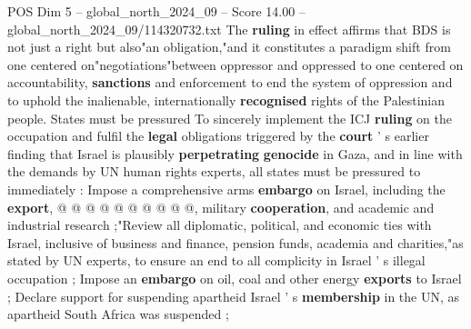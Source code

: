 \begin{textsample}{POS Dim 5 – global\_north\_2024\_09 – Score 14.00 – global\_north\_2024\_09/114320732.txt}
The \textbf{ruling} in effect affirms that BDS is not just a right but also"an obligation,"and it constitutes a paradigm shift from one centered on"negotiations"between oppressor and oppressed to one centered on accountability, \textbf{sanctions} and enforcement to end the system of oppression and to uphold the inalienable, internationally \textbf{recognised} rights of the Palestinian people.
States must be pressured To sincerely implement the ICJ \textbf{ruling} on the occupation and fulfil the \textbf{legal} obligations triggered by the \textbf{court} ' s earlier finding that Israel is plausibly \textbf{perpetrating} \textbf{genocide} in Gaza, and in line with the demands by UN human rights experts, all states must be pressured to immediately : Impose a comprehensive arms \textbf{embargo} on Israel, including the \textbf{export}, @ @ @ @ @ @ @ @ @ @, military \textbf{cooperation}, and academic and industrial research ;"Review all diplomatic, political, and economic ties with Israel, inclusive of business and finance, pension funds, academia and charities,"as stated by UN experts, to ensure an end to all complicity in Israel ' s illegal occupation ; Impose an \textbf{embargo} on oil, coal and other energy \textbf{exports} to Israel ; Declare support for suspending apartheid Israel ' s \textbf{membership} in the UN, as apartheid South Africa was suspended ;

\end{textsample}
